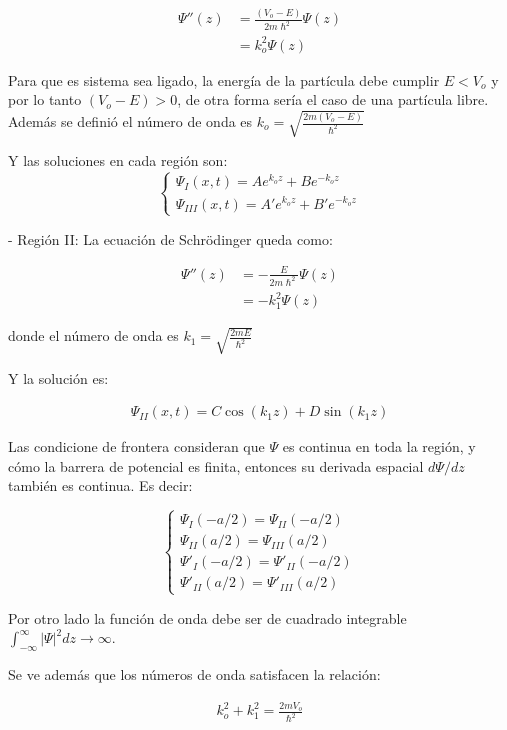 \documentclass[a4paper]{article}
\theoremstyle{definition}
\theoremstyle{plain}
\begin{document}
\begin{align*}
    \Psi''(z) &= \frac{(V_o-E)}{2m \hslash^2} \Psi(z) \\
    &= k_o^2  \Psi(z)
\end{align*}

Para que es sistema sea ligado, la energía de la partícula debe cumplir $E<V_o$ y por lo tanto $(V_o - E)>0$, de otra forma sería el caso de una partícula libre. Además se definió el número de onda es $k_o = \sqrt{\frac{2m (V_o-E)}{\hslash^2}} $

Y las soluciones en cada región son:
$$
\begin{cases}
\Psi_I(x, t) = A e^{ k_o z} + Be^{- k_o z} \\
\Psi_{III}(x, t) = A' e^{k_o z} + B' e^{-k_o z}
\end{cases}
$$


- Región II:
La ecuación de Schrödinger queda como: 

\begin{align*}
    \Psi''(z) &= -\frac{E}{2m \hslash^2} \Psi(z)\\
    &= - k_1^2  \Psi(z)
\end{align*}

donde el número de onda es $k_1 = \sqrt{\frac{2m E}{\hslash^2}} $

Y la solución es:

\begin{align*}
    \Psi_{II}(x, t) = C \cos(k_1 z) + D \sin(k_1 z)
\end{align*}

Las condicione de frontera consideran que $\Psi$ es continua en toda la región, y cómo la barrera de potencial es finita, entonces su derivada espacial $d\Psi/dz$ también es continua. Es decir:

$$
\begin{cases}
\Psi_I(-a/2) = \Psi_{II}(-a/2) \\
\Psi_{II}(a/2) = \Psi_{III}(a/2) \\
\Psi'_I(-a/2) = \Psi'_{II}(-a/2) \\
\Psi'_{II}(a/2) = \Psi'_{III}(a/2)
\end{cases}
$$

Por otro lado la función de onda debe ser de cuadrado integrable $\int_{-\infty}^{\infty} |\Psi|^2 dz \rightarrow \infty$.

Se ve además que los números de onda satisfacen la relación:

\begin{align*}
    k_o^2 + k_1^2 = \frac{2mV_o}{\hslash^2}
\end{align*}
\end{document}
